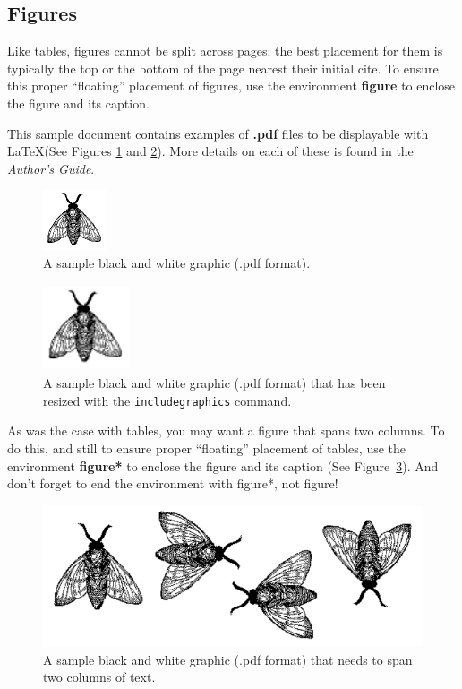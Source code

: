 \documentclass{vldb}
\begin{document}
\subsection{Figures}
Like tables, figures cannot be split across pages; the
best placement for them
is typically the top or the bottom of the page nearest
their initial cite.  To ensure this proper ``floating'' placement
of figures, use the environment
\textbf{figure} to enclose the figure and its caption.

This sample document contains examples of \textbf{.pdf} files to be
displayable with \LaTeX (See Figures \ref{fig:fly} and \ref{fig:bigfly}).  More details on each of these is found in the
\textit{Author's Guide}.

\begin{figure}
\centering
\includegraphics{fly}
\caption{A sample black and white graphic (.pdf format).}
\label{fig:fly}
\end{figure}

\begin{figure}
\centering
\includegraphics[width=1in,height=1in]{fly}
\caption{A sample black and white graphic (.pdf format)
that has been resized with the \texttt{includegraphics} command.}
\label{fig:bigfly}
\end{figure}


As was the case with tables, you may want a figure
that spans two columns.  To do this, and still to
ensure proper ``floating'' placement of tables, use the environment
\textbf{figure*} to enclose the figure and its caption (See Figure~\ref{fig:flies}). And don't forget to end the environment with {figure*}, not {figure}!

\begin{figure}
\centering
\includegraphics{flies}
\caption{A sample black and white graphic (.pdf format)
that needs to span two columns of text.}
\label{fig:flies}
\end{figure}
\end{document}
